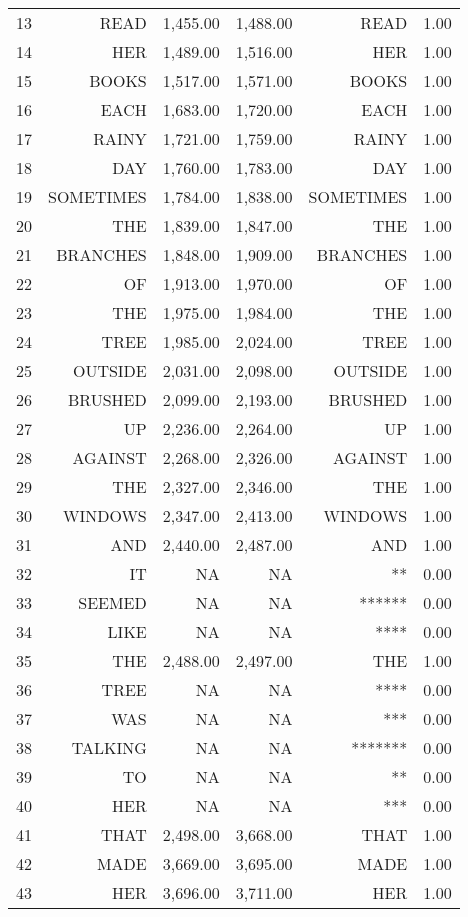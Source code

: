 \documentclass[
  english,
  man, fleqn, noextraspace]{apa6}
\begin{document}
\begin{center}
\begin{ThreePartTable}
{\begin{longtable}{rrrrrr}
13 & READ & 1,455.00 & 1,488.00 & READ & 1.00\\
14 & HER & 1,489.00 & 1,516.00 & HER & 1.00\\
15 & BOOKS & 1,517.00 & 1,571.00 & BOOKS & 1.00\\
16 & EACH & 1,683.00 & 1,720.00 & EACH & 1.00\\
17 & RAINY & 1,721.00 & 1,759.00 & RAINY & 1.00\\
18 & DAY & 1,760.00 & 1,783.00 & DAY & 1.00\\
19 & SOMETIMES & 1,784.00 & 1,838.00 & SOMETIMES & 1.00\\
20 & THE & 1,839.00 & 1,847.00 & THE & 1.00\\
21 & BRANCHES & 1,848.00 & 1,909.00 & BRANCHES & 1.00\\
22 & OF & 1,913.00 & 1,970.00 & OF & 1.00\\
23 & THE & 1,975.00 & 1,984.00 & THE & 1.00\\
24 & TREE & 1,985.00 & 2,024.00 & TREE & 1.00\\
25 & OUTSIDE & 2,031.00 & 2,098.00 & OUTSIDE & 1.00\\
26 & BRUSHED & 2,099.00 & 2,193.00 & BRUSHED & 1.00\\
27 & UP & 2,236.00 & 2,264.00 & UP & 1.00\\
28 & AGAINST & 2,268.00 & 2,326.00 & AGAINST & 1.00\\
29 & THE & 2,327.00 & 2,346.00 & THE & 1.00\\
30 & WINDOWS & 2,347.00 & 2,413.00 & WINDOWS & 1.00\\
31 & AND & 2,440.00 & 2,487.00 & AND & 1.00\\
32 & IT & NA & NA & ** & 0.00\\
33 & SEEMED & NA & NA & ****** & 0.00\\
34 & LIKE & NA & NA & **** & 0.00\\
35 & THE & 2,488.00 & 2,497.00 & THE & 1.00\\
36 & TREE & NA & NA & **** & 0.00\\
37 & WAS & NA & NA & *** & 0.00\\
38 & TALKING & NA & NA & ******* & 0.00\\
39 & TO & NA & NA & ** & 0.00\\
40 & HER & NA & NA & *** & 0.00\\
41 & THAT & 2,498.00 & 3,668.00 & THAT & 1.00\\
42 & MADE & 3,669.00 & 3,695.00 & MADE & 1.00\\
43 & HER & 3,696.00 & 3,711.00 & HER & 1.00\\

\end{longtable}}
\end{ThreePartTable}
\end{center}
\end{document}
